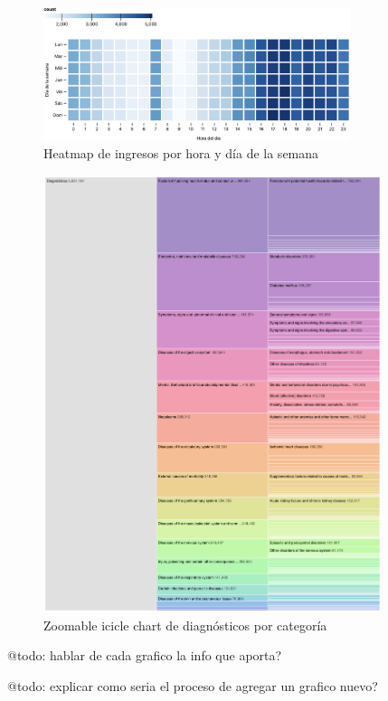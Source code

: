 \begin{figure}[H]
  \centering
  \includegraphics[width=0.8\textwidth]{imagenes/chart4.png}
  \caption{Heatmap de ingresos por hora y día de la semana}
  \label{fig:chart4}
\end{figure}


\begin{figure}[H]
  \centering
  \includegraphics[width=0.88\textwidth]{imagenes/chart5.png}
  \caption{Zoomable icicle chart de diagnósticos por categoría}
  \label{fig:chart5}
\end{figure}

@todo: hablar de cada grafico la info que aporta?

@todo: explicar como seria el proceso de agregar un grafico nuevo?